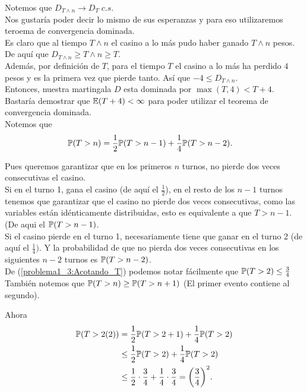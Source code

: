 	Notemos que $D_{T \wedge n} \longrightarrow D_T \; c.s.$\\
	
	Nos gustaría poder decir lo mismo de sus esperanzas y para eso utilizaremos teroema de convergencia dominada.\\
	
	Es claro que al tiempo $T \wedge n$ el casino a lo más pudo haber ganado $T \wedge n$ pesos.
	De aquí que $D_{T \wedge n} \geq T \wedge n \geq T$.\\
	
	Además, por definición de $T$, para el tiempo $T$ el casino a lo más ha perdido $4$ pesos y es la primera vez que 
	pierde tanto. Así que $-4 \leq D_{T \wedge n}$.\\ 
	
	Entonces, nuestra martingala $D$ esta dominada por $\max(T, 4) < T + 4$. Bastaría demostrar que $\mathbb{E}(T+4) < \infty$ para poder
	utilizar el teorema de convergencia dominada.\\
	
	Notemos que 
	\begin{align}\label{problema1_3:Acotando_T}
		\mathbb{P}(T > n) &= \frac{1}{2} \mathbb{P}(T > n-1) + \frac{1}{4} \mathbb{P}(T > n-2). 
	\end{align}
	
	Pues queremos garantizar que en los primeros $n$ turnos, no pierde dos veces consecutivas el casino.\\
	
	Si en el turno 1, gana el casino (de aquí el $\frac{1}{2}$), en el resto de los $n-1$ turnos tenemos que garantizar que 
	el casino no pierde dos veces consecutivas, como las variables están idénticamente distribuidas, esto es equivalente a que
	$T>n-1$. (De aqui el $\mathbb{P}(T > n-1)$.\\
	
	Si el casino pierde en el turno 1, necesariamente tiene que ganar en el turno 2 (de aquí el $\frac{1}{4})$. Y la probabilidad
	de que no pierda dos veces consecutivas en los siguientes $n-2$ turnos es $\mathbb{P}(T > n-2)$.\\					    
	
	De (\ref{problema1_3:Acotando_T}) podemos notar fácilmente que $\mathbb{P}(T > 2) \leq \frac{3}{4}$\\
	
	También notemos que $\mathbb{P}(T > n ) \geq \mathbb{P}(T > n + 1)$ (El primer evento contiene al segundo).
	
	Ahora
	\begin{align}
		\mathbb{P}(T > 2 (2)) &=     \frac{1}{2} \mathbb{P}(T > 2+1) + \frac{1}{4} \mathbb{P}(T > 2) \\
					   &\leq  \frac{1}{2} \mathbb{P}(T > 2) + \frac{1}{4} \mathbb{P}(T > 2) \\
					   &\leq  \frac{1}{2} \cdot \frac{3}{4} + \frac{1}{4} \cdot \frac{3}{4} = \bigg(\frac{3}{4}\bigg)^2.
	\end{align}
	
